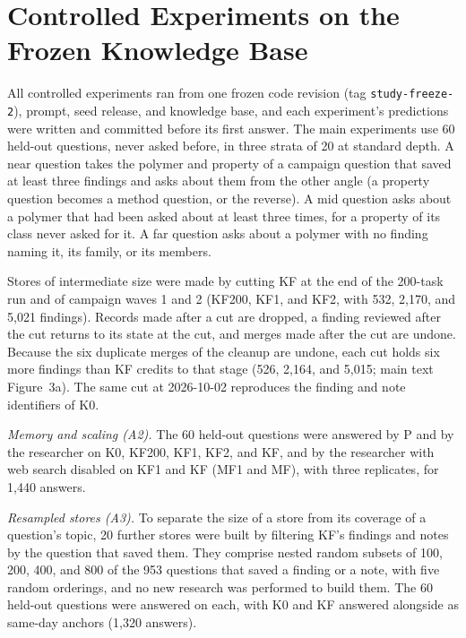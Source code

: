 \documentclass[journal=mamobx,manuscript=suppinfo]{achemso}
\newcommand{\code}[1]{\texttt{#1}}
\begin{document}
\section{Controlled Experiments on the Frozen Knowledge Base}
\label{si:experiments}

All controlled experiments ran from one frozen code revision (tag \code{study-freeze-2}), prompt, seed release, and knowledge base, and each experiment's predictions were written and committed before its first answer.
The main experiments use 60 held-out questions, never asked before, in three strata of 20 at standard depth.
A near question takes the polymer and property of a campaign question that saved at least three findings and asks about them from the other angle (a property question becomes a method question, or the reverse).
A mid question asks about a polymer that had been asked about at least three times, for a property of its class never asked for it.
A far question asks about a polymer with no finding naming it, its family, or its members.

Stores of intermediate size were made by cutting KF at the end of the 200-task run and of campaign waves 1 and 2 (KF200, KF1, and KF2, with 532, 2,170, and 5,021 findings).
Records made after a cut are dropped, a finding reviewed after the cut returns to its state at the cut, and merges made after the cut are undone.
Because the six duplicate merges of the cleanup are undone, each cut holds six more findings than KF credits to that stage (526, 2,164, and 5,015; main text Figure~3a).
The same cut at 2026-10-02 reproduces the finding and note identifiers of K0.

\emph{Memory and scaling (A2).}
The 60 held-out questions were answered by P and by the researcher on K0, KF200, KF1, KF2, and KF, and by the researcher with web search disabled on KF1 and KF (MF1 and MF), with three replicates, for 1,440 answers.

\emph{Resampled stores (A3).}
To separate the size of a store from its coverage of a question's topic, 20 further stores were built by filtering KF's findings and notes by the question that saved them.
They comprise nested random subsets of 100, 200, 400, and 800 of the 953 questions that saved a finding or a note, with five random orderings, and no new research was performed to build them.
The 60 held-out questions were answered on each, with K0 and KF answered alongside as same-day anchors (1,320 answers).
\end{document}
